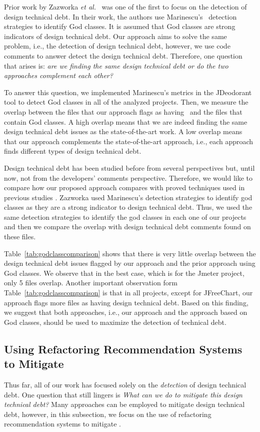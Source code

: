 Prior work by Zazworka \emph{et al.}~\cite{Zazworka2011MTD} was one of the first to focus on the detection of design technical debt. In their work, the authors use Marinescu's~\cite{Marinescu2004ICSM} detection strategies to identify God classes. It is assumed that God classes are strong indicators of design technical debt. Our approach aims to solve the same problem, i.e., the detection of design technical debt, however, we use code comments to answer detect the design technical debt. Therefore, one question that arises is: \emph{are we finding the same design technical debt or do the two approaches complement each other?} 

To answer this question, we implemented Marinescu's metrics in the JDeodorant tool to detect God classes in all of the analyzed projects. Then, we measure the overlap between the files that our approach flags as having \SADTD~and the files that contain God classes. A high overlap means that we are indeed finding the same design technical debt issues as the state-of-the-art work. A low overlap means that our approach complements the state-of-the-art approach, i.e., each approach finds different types of design technical debt.

Design technical debt has been studied before from several perspectives but, until now, not from the developers' comments perspective. Therefore, we would like to compare how our proposed approach compares with proved techniques used in previous studies \cite{Zazworka2011MTD}. Zazworka used Marinescu's \cite{Marinescu2004ICSM} detection strategies to identify god classes as they are a strong indicator to design technical debt. Thus, we used the same detection strategies to identify the god classes in each one of our projects and then we  compare the overlap with design technical debt comments found on these files.

Table~\ref{tab:godclasscomparison} shows that there is very little overlap between the design technical debt issues flagged by our approach and the prior approach using God classes. We observe that in the best case, which is for the Jmeter project, only 5 files overlap. Another important observation form Table~\ref{tab:godclasscomparison} is that in all projects, except for JFreeChart, our approach flags more files as having design technical debt. Based on this finding, we suggest that both approaches, i.e., our approach and the approach based on God classes, should be used to maximize the detection of technical debt.

\subsection{Using Refactoring Recommendation Systems to Mitigate \SADTD}
Thus far, all of our work has focused solely on the \emph{detection} of design technical debt. One question that still lingers is \emph{What can we do to mitigate this design technical debt?}  Many approaches can be employed to mitigate design technical debt, however, in this subsection, we focus on the use of refactoring recommendation systems to mitigate \SADTD.

